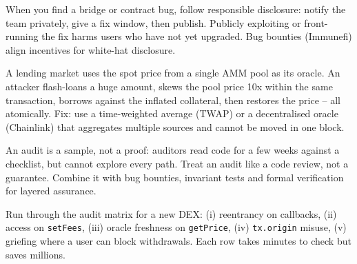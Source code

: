 \begin{remark}\label{rem:disclosure}
When you find a bridge or contract bug, follow responsible disclosure: notify the team privately, give a fix window, then publish. Publicly exploiting or front-running the fix harms users who have not yet upgraded. Bug bounties (Immunefi) align incentives for white-hat disclosure.
\end{remark}

\begin{example}\label{ex:oracle}
A lending market uses the spot price from a single AMM pool as its oracle. An attacker flash-loans a huge amount, skews the pool price 10x within the same transaction, borrows against the inflated collateral, then restores the price -- all atomically. Fix: use a time-weighted average (TWAP) or a decentralised oracle (Chainlink) that aggregates multiple sources and cannot be moved in one block.
\end{example}

\begin{remark}\label{rem:audit-sampling}
An audit is a sample, not a proof: auditors read code for a few weeks against a checklist, but cannot explore every path. Treat an audit like a code review, not a guarantee. Combine it with bug bounties, invariant tests and formal verification for layered assurance.
\end{remark}

\begin{example}\label{ex:checklist}
Run through the audit matrix for a new DEX: (i) reentrancy on callbacks, (ii) access on \texttt{setFees}, (iii) oracle freshness on \texttt{getPrice}, (iv) \texttt{tx.origin} misuse, (v) griefing where a user can block withdrawals. Each row takes minutes to check but saves millions.
\end{example}

